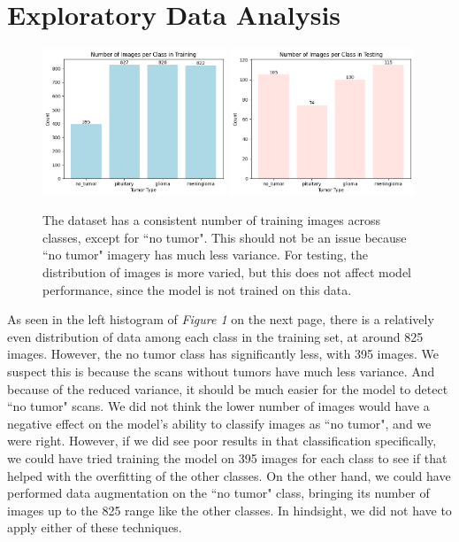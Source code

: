 \documentclass[conference]{IEEEtran}
\begin{document}
\section{\large Exploratory Data Analysis}
\begin{figure}[!ht]
    \centering
    \includegraphics[width=0.49\textwidth]{ImagesPerClassTraining.png}
    \hfill
    \includegraphics[width=0.49\textwidth]{ImagesPerClassTesting.png}
    \caption{\large The dataset has a consistent number of training images across classes, except for ``no tumor". This should not be an issue because ``no tumor" imagery has much less variance. For testing, the distribution of images is more varied, but this does not affect model performance, since the model is not trained on this data.}
    \label{images-per-class}
\end{figure}

As seen in the left histogram of \textit{Figure 1} on the next page, there is a relatively even distribution of data among each class in the training set, at around 825 images. However, the no tumor class has significantly less, with 395 images. We suspect this is because the scans without tumors have much less variance. And because of the reduced variance, it should be much easier for the model to detect ``no tumor" scans. We did not think the lower number of images would have a negative effect on the model's ability to classify images as ``no tumor", and we were right. However, if we did see poor results in that classification specifically, we could have tried training the model on 395 images for each class to see if that helped with the overfitting of the other classes. On the other hand, we could have performed data augmentation on the ``no tumor" class, bringing its number of images up to the 825 range like the other classes. In hindsight, we did not have to apply either of these techniques.
\end{document}
